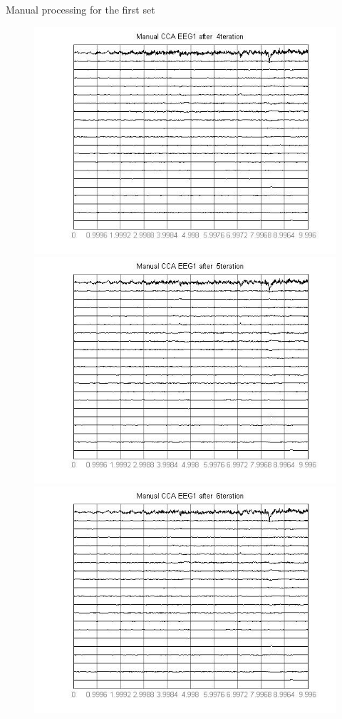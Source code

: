 \documentclass[t,12pt,english
\ifx\beamermode\undefined\else,\beamermode\fi
]{beamer}
\begin{document}
\begin{frame}{Manual processing  for the first set}
\begin{figure}[!htbp]
\includegraphics[width=1\textwidth]{12.jpg}
\endminipage\hfill
{}%
\centering
\includegraphics[width=1\textwidth]{13.jpg}\\
\includegraphics[width=1\textwidth]{14.jpg}
\endminipage\hfill
\end{figure}
  
\end{frame}  
    
\end{document}

